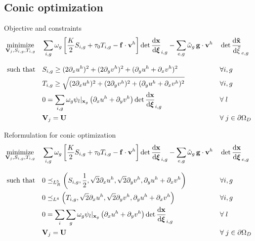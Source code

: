 \documentclass{beamer}  %
\newcommand{\xx}{\mathbf{x}}
\newcommand{\vv}{\mathbf{v}}
\DeclareMathOperator*{\minimize}{minimize}
\begin{document}
\subsection{Conic optimization}
\begin{frame}{Objective and constraints}
    \small
    \begin{alignat*}{2}
        \minimize_{\mathbf{V}_j, S_{i,g}, T_{i,g}} \quad &\sum_{i,g} \omega_g \left[\frac{K}{2} S_{i,g} + \tau_0 T_{i,g} - \mathbf{f} \cdot \vv^h \right] \det \dv{\mathbf{x}}{\boldsymbol \xi}_{i,g} - \sum_{e,g} \tilde \omega_g \,\mathbf{g}\cdot \vv^h &&\det \dv{\mathbf{\tilde x}}{\boldsymbol \tilde \xi}_{e,g}\\[8pt]
        \text{such that} \quad & S_{i,g} \geq (2\partial_x{u^h})^2 + (2\partial_y{v^h})^2 + (\partial_y{u^h}+\partial_x{v^h})^2 && \forall i, g\\
        &T_{i,g} \geq \sqrt{(2\partial_x{u^h})^2 + (2\partial_y{v^h})^2 + (\partial_y{u^h}+\partial_x{v^h})^2} && \forall i, g\\
        &0 = \sum_{i,g} \omega_g \psi_l \vert_{\xx_g} \left(\partial_x u^h + \partial_y v^h\right) \det \dv{\mathbf{x}}{\boldsymbol \xi}_{i,g} && \forall\; l\\
        &\mathbf{V}_{j} = \mathbf{U} && \forall\; j \in \partial\Omega_D
    \end{alignat*}
    \normalsize
\end{frame}

\begin{frame}{Reformulation for conic optimization}
    \small
    \begin{alignat*}{2}
        \minimize_{\mathbf{V}_j, S_{i,g}, T_{i,g}} \quad &\sum_{i,g} \omega_g \left[\frac{K}{2} S_{i,g} + \tau_0 T_{i,g} - \mathbf{f} \cdot \vv^h \right] \det \dv{\mathbf{x}}{\boldsymbol \xi}_{i,g}-\sum_{e,g} \tilde \omega_g \,\mathbf{g}\cdot \vv^h &&\det \dv{\mathbf{x}}{\boldsymbol \xi}_{e,g}\\[8pt]
        \text{such that} \quad & 0 \preceq_{L^5_R} \left(S_{i,g}, \frac{1}{2}, \sqrt{2}\partial_x u^h, \sqrt{2}\partial_y v^h, \partial_y u^h+\partial_x v^h\right) && \forall i, g\\
        & 0 \preceq_{L^4} \left(T_{i,g}, \sqrt{2}\partial_x u^h, \sqrt{2}\partial_y v^h, \partial_y u^h+\partial_x v^h\right) && \forall i, g\\
        &0 = \sum_i \sum_g \omega_g \psi_l \vert_{\xx_g} \left(\partial_x u^h + \partial_y v^h\right) \det \dv{\mathbf{x}}{\boldsymbol \xi}_{i,g} && \forall\; l\\
        &\mathbf{V}_{j} = \mathbf{U} && \forall\; j \in \partial\Omega_D
    \end{alignat*}
    \normalsize
\end{frame}
\end{document}
